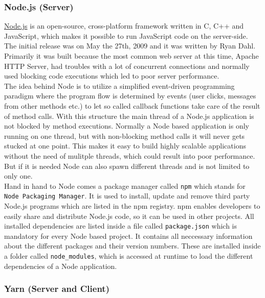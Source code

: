 \documentclass[]{article}
\begin{document}
\subsubsection{Node.js (Server)}\label{node.js-server}

\href{https://nodejs.org/en/}{Node.js} is an open-source, cross-platform
framework written in C, C++ and JavaScript, which makes it possible to
run JavaScript code on the server-side. The initial release was on May
the 27th, 2009 and it was written by Ryan Dahl. Primarily it was built
because the most common web server at this time, Apache HTTP Server, had
troubles with a lot of concurrent connections and normally used blocking
code executions which led to poor server performance.\\
The idea behind Node is to utilize a simplified event-driven programming
paradigm where the program flow is determined by events (user clicks,
messages from other methods etc.) to let so called callback functions
take care of the result of method calls. With this structure the main
thread of a Node.js application is not blocked by method executions.
Normally a Node based application is only running on one thread, but
with non-blocking method calls it will never gets stucked at one point.
This makes it easy to build highly scalable applications without the
need of mulitple threads, which could result into poor performance. But
if it is needed Node can also spawn different threads and is not limited
to only one.\\
Hand in hand to Node comes a package manager called \texttt{npm} which
stands for \texttt{Node\ Packaging\ Manager}. It is used to install,
update and remove third party Node.js programs which are listed in the
npm registry. npm enables developers to easily share and distribute
Node.js code, so it can be used in other projects. All installed
dependencies are listed inside a file called \texttt{package.json} which
is mandatory for every Node based project. It contains all neccessary
information about the different packages and their version numbers.
These are installed inside a folder called \texttt{node\_modules}, which
is accessed at runtime to load the different dependencies of a Node
application.

\subsubsection{Yarn (Server and Client)}\label{yarn-server-and-client}
\end{document}
